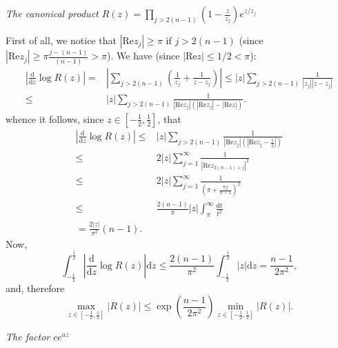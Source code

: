 \textit{The canonical product $R(z)=\prod_{j>2(n-1)}\left( 1- \frac{z}{z_j} \right) e^{z /z_j}$}

First of all, we notice that $\left| \mathrm{Re}z_j \right| \ge \pi$ if $j>2(n-1)$ (since $\left| \mathrm{Re} z_j \right|\ge \pi \frac{j-(n-1)}{(n-1)}> \pi $). We have (since $\left| \mathrm{Re} z\right|\le 1 /2<\pi $):
\begin{equation*}
  \begin{aligned}
    \left| \frac{\mathrm{d}}{\mathrm{d}z}\log R(z) \right| = & \left| \sum_{j>2(n-1)} \left( \frac{1}{z_j}+\frac{1}{z-z_j} \right)  \right| \le \left| z \right| \sum_{j>2(n-1)} \frac{1}{\left| z_j \right| \left| z-z_j \right| }\\
    \le  & \left| z \right| \sum_{j>2(n-1)}^{} \frac{1}{\left| \mathrm{Re}z_j \right| \left( \left| \mathrm{Re}z_j \right| -\left| \mathrm{Re}z \right|  \right) }.
  \end{aligned}
\end{equation*}
whence it follows, since $z\in \left[ -\frac{1}{2},\frac{1}{2} \right] $, that 
\begin{equation*}
  \begin{aligned}
    \left| \frac{\mathrm{d}}{\mathrm{d}z}\log R(z) \right| \le &\left| z \right| \sum_{j>2(n-1)}^{} \frac{1}{\left| \mathrm{Re}z_j \right| \left( \left| \mathrm{Re}z_j-\frac{1}{2} \right|  \right) }\\
    \le & 2\left| z \right| \sum_{j=1}^{\infty} \frac{1}{\left| \mathrm{Re} z_{2(n-1)+j} \right|^2 }\\
    \le & 2 \left| z \right| \sum_{j=1}^{\infty} \frac{1}{\left( \pi+ \frac{\pi j}{n-1} \right) ^2}\\
    \le  & \frac{2(n-1)}{\pi}\left| z \right| \int_{\pi}^{\infty} \frac{\mathrm{d}t}{t^2}\\
    =\frac{2\left| z \right| }{\pi^2}(n-1).
  \end{aligned}
\end{equation*}
Now,
\[
  \int_{-\frac{1}{2}}^{\frac{1}{2}}\left| \frac{\mathrm{d}}{\mathrm{d}z}\log R(z)\right| \mathrm{d}z\le  \frac{2(n-1)}{\pi^2}\int_{-\frac{1}{2}}^{\frac{1}{2}}\left| z \right| \mathrm{d}z=\frac{n-1}{2\pi^2},
\] 
and, therefore
\[
  \max_{z\in \left[ -\frac{1}{2},\frac{1}{2} \right] }\left| R(z) \right| \le \exp\left( \frac{n-1}{2\pi^2} \right) \min_{z\in \left[ -\frac{1}{2},\frac{1}{2} \right] }\left| R(z) \right| .
\] 

\textit{The factor $ce^{az}$} 


